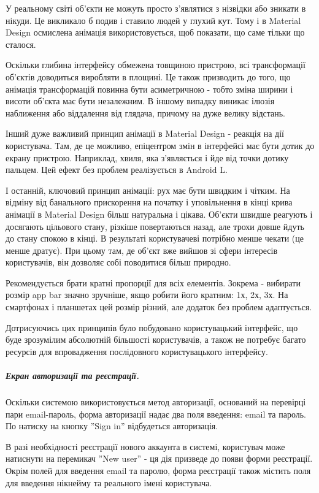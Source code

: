 \documentclass[../main.tex]{subfiles}
\begin{document}
У реальному світі об'єкти не можуть просто з'являтися з нізвідки або зникати в нікуди. Це викликало б подив і ставило людей у глухий кут. Тому і в Material Design осмислена анімація використовується, щоб показати, що саме тільки що сталося.

Оскільки глибина інтерфейсу обмежена товщиною пристрою, всі трансформації об'єктів доводиться виробляти в площині. Це також призводить до того, що анімація трансформацій повинна бути асиметричною - тобто зміна ширини і висоти об'єкта має бути незалежним. В іншому випадку виникає ілюзія наближення або віддалення від глядача, причому на дуже велику відстань.

Інший дуже важливий принцип анімації в Material Design - реакція на дії користувача. Там, де це можливо, епіцентром змін в інтерфейсі має бути дотик до екрану пристрою. Наприклад, хвиля, яка з'являється і йде від точки дотику пальцем. Цей ефект без проблем реалізується в Android L.

І останній, ключовий принцип анімації: рух має бути швидким і чітким. На відміну від банального прискорення на початку і уповільнення в кінці крива анімації в Material Design більш натуральна і цікава. Об'єкти швидше реагують і досягають цільового стану, різкіше повертаються назад, але трохи довше йдуть до стану спокою в кінці. В результаті користувачеві потрібно менше чекати (це менше дратує). При цьому там, де об'єкт вже вийшов зі сфери інтересів користувачів, він дозволяє собі поводитися більш природно.

Рекомендується брати кратні пропорції для всіх елементів. Зокрема - вибирати розмір app bar значно зручніше, якщо робити його кратним: 1х, 2х, 3х. На смартфонах і планшетах цей розмір різний, але додаток без проблем адаптується.

Дотрисуючись цих принципів було побудовано користувацький інтерфейс, що буде зрозумілим абсолютній більшості користувачів, а також не потребує багато ресурсів для впровадження послідовного користувацького інтерфейсу.

\subparagraph{Екран авторизації та реєстрації.}

Оскільки системою використовується метод авторизації, оснований на перевірці пари email-пароль, форма авторизації надає два поля введення: email та пароль. По натиску на кнопку ''Sign in'' відбудеться авторизація.

В разі необхідності реєстрації нового аккаунта в системі, користувач може натиснути на перемикач ''New user'' - ця дія призведе до появи форми реєстрації. Окрім полей для введення email та паролю, форма реєстрації також містить поля для введення нікнейму та реального імені користувача.
\end{document}

